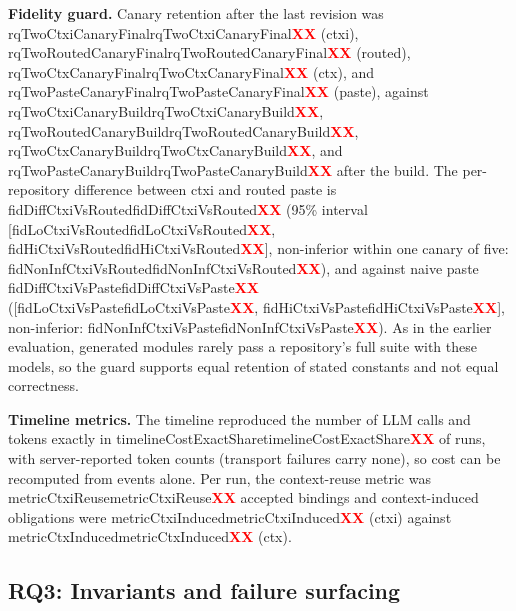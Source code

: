 \documentclass[10pt,conference]{IEEEtran}
\theoremstyle{definition}
\newcommand{\R}[1]{\ifcsname #1\endcsname\csname #1\endcsname\else\textcolor{red}{\textbf{XX}}\fi}
\begin{document}
\textbf{Fidelity guard.} Canary retention after the last revision was \R{rqTwoCtxiCanaryFinal} (ctxi),
\R{rqTwoRoutedCanaryFinal} (routed), \R{rqTwoCtxCanaryFinal} (ctx), and \R{rqTwoPasteCanaryFinal} (paste),
against \R{rqTwoCtxiCanaryBuild}, \R{rqTwoRoutedCanaryBuild}, \R{rqTwoCtxCanaryBuild}, and
\R{rqTwoPasteCanaryBuild} after the build. The per-repository difference between ctxi and routed paste is
\R{fidDiffCtxiVsRouted} (95\% interval [\R{fidLoCtxiVsRouted}, \R{fidHiCtxiVsRouted}], non-inferior within
one canary of five: \R{fidNonInfCtxiVsRouted}), and against naive paste \R{fidDiffCtxiVsPaste}
([\R{fidLoCtxiVsPaste}, \R{fidHiCtxiVsPaste}], non-inferior: \R{fidNonInfCtxiVsPaste}). As in the earlier
evaluation, generated modules rarely pass a repository's full suite with these models, so the guard supports
equal retention of stated constants and not equal correctness.

\textbf{Timeline metrics.} The timeline reproduced the number of LLM calls and tokens exactly in
\R{timelineCostExactShare} of runs, with server-reported token counts (transport failures carry none), so
cost can be recomputed from events alone. Per run, the context-reuse metric was \R{metricCtxiReuse}
accepted bindings and context-induced obligations were \R{metricCtxiInduced} (ctxi) against
\R{metricCtxInduced} (ctx).

\subsection{RQ3: Invariants and failure surfacing}
\end{document}
